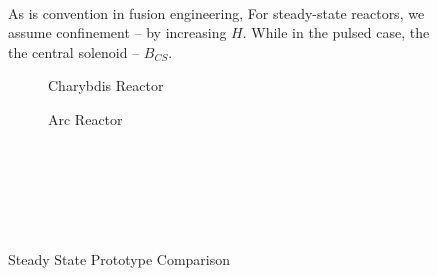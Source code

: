 \clearpage

\newpage

\begin{figure}[h!]
\centering

\caption{} ~ \\
\small As is convention in fusion engineering,  For steady-state reactors, we assume  confinement -- by increasing $H$. While in the pulsed case, the  the central solenoid -- $B_{CS}$. 
\label{fig:selection}
\end{figure}

\clearpage

\newpage

\begin{figure*}[h!]
    \centering
    \hfill 
    \begin{subfigure}[t]{0.45\textwidth}
        \centering
    \begin{adjustbox}{width=\textwidth}
      \Large
      
    \end{adjustbox}
        \caption{Charybdis Reactor}
    \end{subfigure}
    \hfill
    \begin{subfigure}[t]{0.45\textwidth}
        \centering
    \begin{adjustbox}{width=\textwidth}
      \Large
      
    \end{adjustbox}
        \caption{Arc Reactor}
    \end{subfigure}
    \hfill \hfill ~\\ ~\\ ~\\
    \caption{Steady State Prototype Comparison} ~\\
    \label{fig:charybdis}
\end{figure*}

